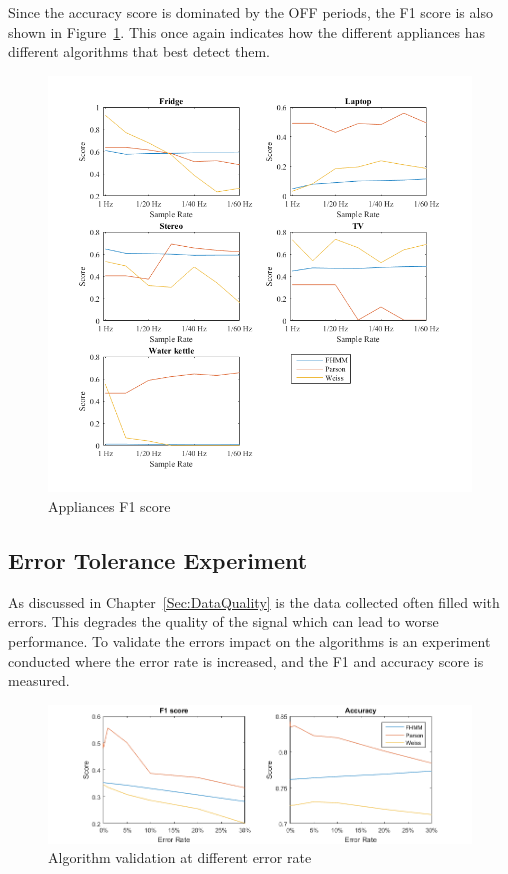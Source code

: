 Since the accuracy score is dominated by the OFF periods, the F1 score is also shown in Figure~\ref{fig:AppF1}. This once again indicates how the different appliances has different algorithms that best detect them.  


\begin{figure}[H]
\centering
\includegraphics[width=1\textwidth]{billeder/App-F1Score.png}
\caption{Appliances F1 score}
\label{fig:AppF1}
\end{figure}

\newpage

\subsection{Error Tolerance Experiment}
\label{Sec:ETE}
As discussed in Chapter~\ref{Sec:DataQuality} is the data collected often filled with errors. This degrades the quality of the signal which can lead to worse performance. To validate the errors impact on the algorithms is an experiment conducted where the error rate is increased, and the F1 and accuracy score is measured. 

\begin{figure}[H]
\centering
\includegraphics[width=1\textwidth]{billeder/AlgoErrorRate.png}
\caption{Algorithm validation at different error rate}
\label{fig:ErrorEx}
\end{figure}

